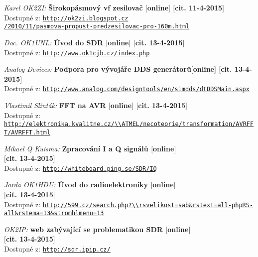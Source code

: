 \clearpage
\def\refname{Seznam použité literatury a studijních materiálů}
\begin{thebibliography}{10}

	{\em  Karel OK2ZI:}
		{\bf Širokopásmový vf zesilovač $[$\textmd{online}$]$ $[$\textmd{cit. 11-4-2015}$]$}\\
		Dostupné z: \texttt{\href{http://ok2zi.blogspot.cz/2010/11/pasmova-propust-predzesilovac-pro-160m.html}{http://ok2zi.blogspot.cz\\/2010/11/pasmova-propust-predzesilovac-pro-160m.html}}
		
	{\em Doc. OK1UNL:}
		{\bf Úvod do SDR $[$\textmd{online}$]$ $[$\textmd{cit. 13-4-2015}$]$}\\
		Dostupné z: \texttt{\url{http://www.ok1cjb.cz/index.php}}
		
	{\em Analog Devices:}
		{\bf Podpora pro vývojáře DDS generátorů$[$\textmd{online}$]$ $[$\textmd{cit. 13-4-2015}$]$}\\
		Dostupné z: \texttt{\url{http://www.analog.com/designtools/en/simdds/dtDDSMain.aspx}}
		
	{\em Vlastimil Slinták:}
		{\bf FFT na AVR $[$\textmd{online}$]$ $[$\textmd{cit. 13-4-2015}$]$}\\
		Dostupné z: \texttt{\url{http://elektronika.kvalitne.cz/\\ATMEL/necoteorie/transformation/AVRFFT/AVRFFT.html}}
		
	{\em Mikael Q Kuisma:}
		{\bf Zpracování I a Q signálů $[$\textmd{online}$]$ \\$[$\textmd{cit. 13-4-2015}$]$}\\
		Dostupné z: \texttt{\url{http://whiteboard.ping.se/SDR/IQ}}


	{\em Jarda OK1HDU:}
		{\bf Úvod do radioelektroniky $[$\textmd{online}$]$ \\$[$\textmd{cit. 13-4-2015}$]$}\\
		Dostupné z: \texttt{\url{http://599.cz/search.php?\\rsvelikost=sab\&rstext=all-phpRS-all\&rstema=13\&stromhlmenu=13}}


	{\em OK2IP:}
		{\bf web zabývající se problematikou SDR $[$\textmd{online}$]$ \\$[$\textmd{cit. 13-4-2015}$]$}\\
		Dostupné z: \texttt{\url{http://sdr.ipip.cz/}}



\end{thebibliography}

